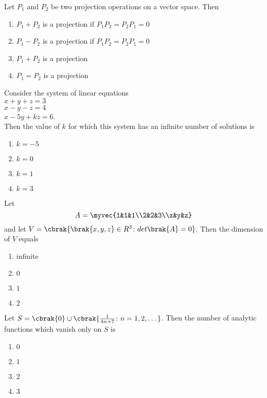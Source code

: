     \item Let $P_1$ and $P_2$ be two projection operations on a vector space. Then
        \begin{enumerate}
            \item $P_1+P_2$ is a projection if $P_1P_2=P_2P_1=0$
            \item $P_1-P_2$ is a projection if $P_1P_2=P_2P_1=0$
            \item $P_1+P_2$ is a projection
            \item $P_1=P_2$ is a projection
        \end{enumerate}
    \item Consider the system of linear equations\\
            $x+y+z=3$\\
            $x-y-z=4$\\
            $x-5y+kz=6$.\\
            Then the value of $k$ for which this  system has an infinite number of solutions is
            \begin{enumerate}
                \item $k=-5$
                \item $k=0$
                \item $k=1$
                \item $k=3$
            \end{enumerate}
    \item Let
        $$A=\myvec{1&1&1\\2&2&3\\x&y&z}$$
        and let $V=\cbrak{\brak{x,y,z}\in R^3\colon det\brak{A}=0}$. Then the dimension of $V$ equals
        \begin{enumerate}
            \item infinite
            \item $0$
            \item $1$
            \item $2$
        \end{enumerate}
    \item Let $S=\cbrak{0}\cup\cbrak{\frac{1}{4n+7}\colon n=1,2,\dots}$. Then the number of analytic functions which vanish only on $S$ is 
    \begin{enumerate}
        \item $0$
        \item $1$
        \item $2$
        \item $3$
    \end{enumerate}
